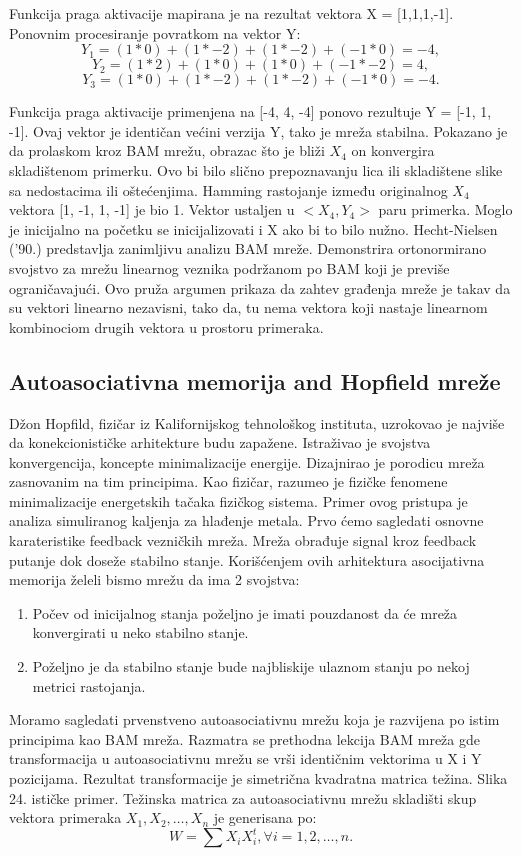 \documentclass[fontsize=11bp, paper=a4]{scrarticle}
\begin{document}
Funkcija praga aktivacije mapirana je na rezultat vektora X = [1,1,1,-1]. Ponovnim procesiranje povratkom na vektor Y:
$$Y_1 = (1*0) + (1*-2) + (1*-2) + (-1*0) = -4,$$
$$Y_2 = (1*2) + (1*0) + (1*0) + (-1*-2) = 4,$$
$$Y_3 = (1*0) + (1*-2) + (1*-2) + (-1*0) = -4.$$

Funkcija praga aktivacije primenjena na [-4, 4, -4] ponovo rezultuje Y = [-1, 1, -1]. Ovaj vektor je identičan većini verzija Y, tako je mreža stabilna. Pokazano je da prolaskom kroz BAM mrežu, obrazac što je bliži $X_4$ on konvergira skladištenom primerku. Ovo bi bilo slično prepoznavanju lica ili skladištene slike sa nedostacima ili oštećenjima. Hamming rastojanje između originalnog $X_4$ vektora [1, -1, 1, -1] je bio 1. Vektor ustaljen u $<X_4, Y_4>$ paru primerka.
Moglo je inicijalno na početku se inicijalizovati i X ako bi to bilo nužno.
Hecht-Nielsen ('90.) predstavlja zanimljivu analizu BAM mreže. Demonstrira ortonormirano svojstvo za mrežu linearnog veznika podržanom po BAM koji je previše ograničavajući. Ovo pruža argumen prikaza da zahtev građenja mreže je takav da su vektori linearno nezavisni, tako da, tu nema vektora koji nastaje linearnom kombinociom drugih vektora u prostoru primeraka. 

\subsection{Autoasociativna memorija and Hopfield mreže}

Džon Hopfild, fizičar iz Kalifornijskog tehnološkog instituta, uzrokovao je najviše da konekcionističke arhitekture budu zapažene. Istraživao je svojstva konvergencija, koncepte minimalizacije energije. Dizajnirao je porodicu mreža zasnovanim na tim principima. Kao fizičar, razumeo je fizičke fenomene minimalizacije energetskih tačaka fizičkog sistema. Primer ovog pristupa je analiza simuliranog kaljenja za hlađenje metala. Prvo ćemo sagledati osnovne karateristike feedback vezničkih mreža. Mreža obrađuje signal kroz feedback putanje dok doseže stabilno stanje. Korišćenjem ovih arhitektura asocijativna memorija želeli bismo mrežu da ima 2 svojstva:
\begin{enumerate}
    \item Počev od inicijalnog stanja poželjno je imati pouzdanost da će mreža konvergirati u neko stabilno stanje.
    \item Poželjno je da stabilno stanje bude najbliskije ulaznom stanju po nekoj metrici rastojanja.
\end{enumerate}
Moramo sagledati prvenstveno autoasociativnu mrežu koja je razvijena po istim principima kao BAM mreža. Razmatra se prethodna lekcija BAM mreža gde transformacija u autoasociativnu mrežu se vrši identičnim vektorima u X i Y pozicijama. Rezultat transformacije je simetrična kvadratna matrica težina. Slika 24. ističke primer. Težinska matrica za autoasociativnu mrežu skladišti skup vektora primeraka ${X_1, X_2, \dots, X_n}$ je generisana po:
$$ W = \sum X_iX_i^t, \forall i = 1,2,\dots,n.$$
\end{document}
